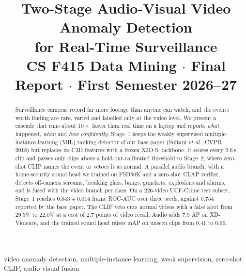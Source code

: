 \documentclass[conference,a4paper]{IEEEtran}
\begin{document}
\title{Two-Stage Audio-Visual Video Anomaly Detection\\for Real-Time Surveillance\\[0.25em]{\large CS F415 Data Mining $\cdot$ Final Report $\cdot$ First Semester 2026--27}}

\author{%
\and
{}
\and
{}
}

\maketitle

\begin{abstract}
Surveillance cameras record far more footage than anyone can watch, and the events worth finding are rare,
varied and labelled only at the video level. We present a cascade that runs about $10\times$ faster than real
time on a laptop and reports \emph{what} happened, \emph{when} and \emph{how confidently}. Stage~1 keeps the
weakly supervised multiple-instance-learning (MIL) ranking detector of our base paper (Sultani \emph{et al.},
CVPR 2018) but replaces its C3D features with a frozen X3D-S backbone. It scores every 2.6\,s clip and passes only
clips above a hold-out-calibrated threshold to Stage~2, where zero-shot CLIP names the event or vetoes it as
normal. A parallel audio branch, with a home-security sound head we trained on FSD50K and a zero-shot CLAP verifier,
detects off-camera screams, breaking glass, bangs, gunshots, explosions and alarms, and is fused with the video branch
per class. On a 226-video UCF-Crime test subset, Stage~1 reaches $0.843\pm0.014$ frame ROC-AUC over three seeds,
against $0.754$ reported by the base paper. The CLIP veto cuts normal videos with a false alert from 29.3\% to
22.0\% at a cost of 2.7 points of video recall. Audio adds 7.9 AP on XD-Violence, and the trained sound head raises
mAP on unseen clips from 0.41 to 0.66.
\end{abstract}

\begin{IEEEkeywords}
video anomaly detection, multiple-instance learning, weak supervision, zero-shot CLIP, audio-visual fusion
\end{IEEEkeywords}
\end{document}
